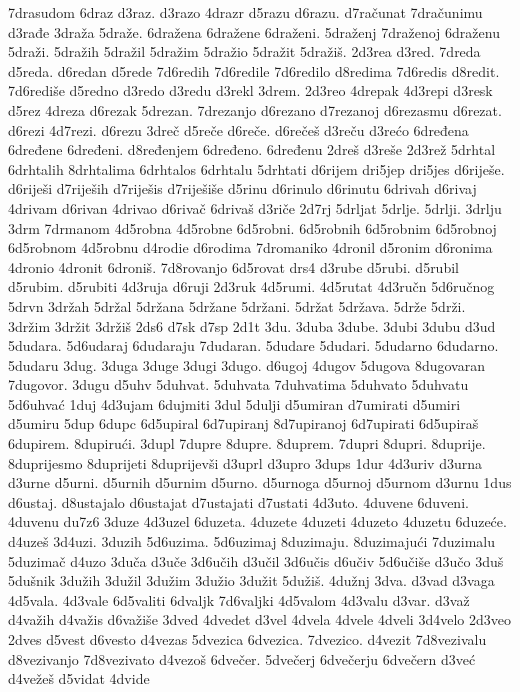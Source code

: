 {7drasudom
6draz
d3raz.
d3razo
4drazr
d5razu
d6razu.
d7računat
7dračunimu
d3rađe
3draža
5draže.
6dražena
6dražene
6draženi.
5draženj
7draženoj
6draženu
5draži.
5dražih
5dražil
5dražim
5dražio
5dražit
5dražiš.
2d3rea
d3red.
7dreda
d5reda.
d6redan
d5rede
7d6redih
7d6redile
7d6redilo
d8redima
7d6redis
d8redit.
7d6rediše
d5redno
d3redo
d3redu
d3rekl
3drem.
2d3reo
4drepak
4d3repi
d3resk
d5rez
4dreza
d6rezak
5drezan.
7drezanjo
d6rezano
d7rezanoj
d6rezasmu
d6rezat.
d6rezi
4d7rezi.
d6rezu
3dreč
d5reče
d6reče.
d6rečeš
d3reču
d3rećo
6dređena
6dređene
6dređeni.
d8ređenjem
6dređeno.
6dređenu
2dreš
d3reše
2d3rež
5drhtal
6drhtalih
8drhtalima
6drhtalos
6drhtalu
5drhtati
d6rijem
dri5jep
dri5jes
d6riješe.
d6riješi
d7riješih
d7riješis
d7riješiše
d5rinu
d6rinulo
d6rinutu
6drivah
d6rivaj
4drivam
d6rivan
4drivao
d6rivač
6drivaš
d3riče
2d7rj
5drljat
5drlje.
5drlji.
3drlju
3drm
7drmanom
4d5robna
4d5robne
6d5robni.
6d5robnih
6d5robnim
6d5robnoj
6d5robnom
4d5robnu
d4rodie
d6rodima
7dromaniko
4dronil
d5ronim
d6ronima
4dronio
4dronit
6droniš.
7d8rovanjo
6d5rovat
drs4
d3rube
d5rubi.
d5rubil
d5rubim.
d5rubiti
4d3ruja
d6ruji
2d3ruk
4d5rumi.
4d5rutat
4d3ručn
5d6ručnog
5drvn
3držah
5držal
5držana
5držane
5držani.
5držat
5država.
5drže
5drži.
3držim
3držit
3držiš
2ds6
d7sk
d7sp
2d1t
3du.
3duba
3dube.
3dubi
3dubu
d3ud
5dudara.
5d6udaraj
6dudaraju
7dudaran.
5dudare
5dudari.
5dudarno
6dudarno.
5dudaru
3dug.
3duga
3duge
3dugi
3dugo.
d6ugoj
4dugov
5dugova
8dugovaran
7dugovor.
3dugu
d5uhv
5duhvat.
5duhvata
7duhvatima
5duhvato
5duhvatu
5d6uhvać
1duj
4d3ujam
6dujmiti
3dul
5dulji
d5umiran
d7umirati
d5umiri
d5umiru
5dup
6dupc
6d5upiral
6d7upiranj
8d7upiranoj
6d7upirati
6d5upiraš
6dupirem.
8dupirući.
3dupl
7dupre
8dupre.
8duprem.
7dupri
8dupri.
8duprije.
8duprijesmo
8duprijeti
8duprijevši
d3uprl
d3upro
3dups
1dur
4d3uriv
d3urna
d3urne
d5urni.
d5urnih
d5urnim
d5urno.
d5urnoga
d5urnoj
d5urnom
d3urnu
1dus
d6ustaj.
d8ustajalo
d6ustajat
d7ustajati
d7ustati
4d3uto.
4duvene
6duveni.
4duvenu
du7z6
3duze
4d3uzel
6duzeta.
4duzete
4duzeti
4duzeto
4duzetu
6duzeće.
d4uzeš
3d4uzi.
3duzih
5d6uzima.
5d6uzimaj
8duzimaju.
8duzimajući
7duzimalu
5duzimač
d4uzo
3duča
d3uče
3d6učih
d3učil
3d6učis
d6učiv
5d6učiše
d3učo
3duš
5dušnik
3dužih
3dužil
3dužim
3dužio
3dužit
5dužiš.
4dužnj
3dva.
d3vad
d3vaga
4d5vala.
4d3vale
6d5valiti
6dvaljk
7d6valjki
4d5valom
4d3valu
d3var.
d3važ
d4važih
d4važis
d6važiše
3dved
4dvedet
d3vel
4dvela
4dvele
4dveli
3d4velo
2d3veo
2dves
d5vest
d6vesto
d4vezas
5dvezica
6dvezica.
7dvezico.
d4vezit
7d8vezivalu
d8vezivanjo
7d8vezivato
d4vezoš
6dvečer.
5dvečerj
6dvečerju
6dvečern
d3već
d4vežeš
d5vidat
4dvide
}
